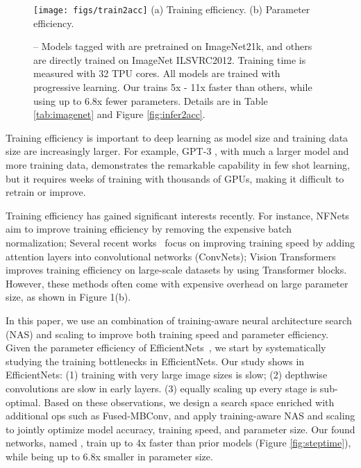 \documentclass{article}
\begin{document}
\begin{figure}[!t]
	\centering
	\texttt{[image: figs/train2acc]}
	\vskip -0.05in
    (a) Training efficiency.
	\vskip 0.1in
    (b) Parameter efficiency.
\caption{
		  -- Models tagged with  are pretrained on ImageNet21k, and others are directly trained on ImageNet ILSVRC2012. Training time is measured with 32 TPU cores.
All {\xnet} models are trained with progressive learning.
		Our {\xnet} trains 5x - 11x faster than others, while using up to 6.8x fewer parameters.
Details are in Table \ref{tab:imagenet} and Figure \ref{fig:infer2acc}.
    }
	\label{fig:train2acc}
	\vskip -0.1in
\end{figure}
 Training efficiency is important to deep learning as model size and training data size are increasingly larger. For example, GPT-3 \cite{gpt320},  with much a larger model and more training data,  demonstrates the remarkable capability in few shot learning,
but it requires weeks of training with thousands of GPUs, making it  difficult  to retrain or improve. 

Training efficiency has gained significant interests recently. For instance, NFNets~\cite{nfnet21} aim to improve training efficiency by removing the expensive batch normalization; Several recent works~\cite{botnet21} focus on improving training speed by adding attention layers into convolutional networks (ConvNets); Vision Transformers~\cite{vit21} improves training efficiency on large-scale datasets by using Transformer blocks. However, these methods often come with expensive overhead on large parameter size, as shown in Figure 1(b).

In this paper, we use an combination of training-aware neural architecture search (NAS) and scaling  to improve both training speed and parameter efficiency. Given the parameter efficiency of EfficientNets~\cite{efficientnet19}, we start by systematically studying the training bottlenecks in EfficientNets. Our study shows in EfficientNets: (1) training with very large image sizes is slow; (2) depthwise convolutions are slow in early layers. (3) equally scaling up every stage is sub-optimal. Based on these observations, we design a search space enriched with additional ops such as Fused-MBConv, and apply training-aware NAS and scaling to jointly optimize model accuracy, training speed, and parameter size. Our found networks, named \emph{{\xnet}}, train up to 4x faster than prior models (Figure \ref{fig:steptime}), while being up to 6.8x smaller in parameter size.
\end{document}
